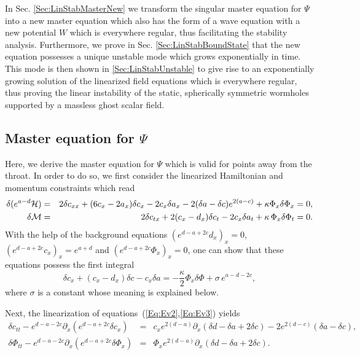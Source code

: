 \documentclass[           %
               showpacs,            %
               preprintnumbers,     %
               aps,                 %
               prd,                 %
               superscriptaddress,      %
               nofootinbib,         %
               tightenlines,        %
               floats,floatfix      %
               ]{revtex4}
\begin{document}
In Sec. \ref{Sec:LinStabMasterNew} we transform the singular master
equation for $\Psi$ into a new master equation which also has the form
of a wave equation with a new potential $W$ which is everywhere
regular, thus facilitating the stability analysis. Furthermore, we
prove in Sec. \ref{Sec:LinStabBoundState} that the new equation
possesses a unique unstable mode which grows exponentially in
time. This mode is then shown in \ref{Sec:LinStabUnstable} to give
rise to an exponentially growing solution of the linearized field
equations which is everywhere regular, thus proving the linear
instability of the static, spherically symmetric wormholes supported
by a massless ghost scalar field.


\subsection{Master equation for $\Psi$}
\label{Sec:LinStabMasterPhi}

Here, we derive the master equation for $\Psi$ which is valid for
points away from the throat. In order to do so, we first consider the
linearized Hamiltonian and momentum constraints which read
\begin{eqnarray}
\delta( e^{a-d} {\cal H}) &=& 2\delta c_{xx} + (6c_x - 2a_x)\delta c_x 
 - 2c_x\delta a_x - 2(\delta a - \delta c)e^{2(a-c)} + \kappa\Phi_x\delta\Phi_x
 = 0,\\
\delta {\cal M} &=& 2\delta c_{tx} + 2(c_x - d_x)\delta c_t - 2c_x\delta a_t 
 + \kappa\, \Phi_x\delta\Phi_t = 0.
\end{eqnarray}
With the help of the background equations $(e^{d-a+2c} d_x)_x = 0$,
$(e^{d-a+2c} c_x)_x = e^{a+d}$ and $(e^{d-a+2c}\Phi_x)_x = 0$, one can
show that these equations possess the first integral
\begin{equation}
\delta c_x + (c_x - d_x)\delta c - c_x\delta a 
 = -\frac{\kappa}{2}\Phi_x\delta\Phi + \sigma\, e^{a-d-2c},
\label{Eq:FirstIntegral}
\end{equation}
where $\sigma$ is a constant whose meaning is explained below.

Next, the linearization of equations~(\ref{Eq:Ev2},\ref{Eq:Ev3})
yields
\begin{eqnarray}
\delta c_{tt} - e^{d-a-2c}\partial_x\left( e^{d-a+2c}\delta c_x \right)
 &=& c_x e^{2(d-a)} \partial_x(\delta d - \delta a + 2\delta c)
  - 2 e^{2(d-c)} (\delta a - \delta c),
\label{Eq:LinEv2}\\
\delta\Phi_{tt} - e^{d-a-2c}\partial_x\left( e^{d-a+2c}\delta\Phi_x \right)
 &=& \Phi_x e^{2(d-a)} \partial_x(\delta d - \delta a + 2\delta c).
\label{Eq:LinEv3}
\end{eqnarray}
\end{document}
